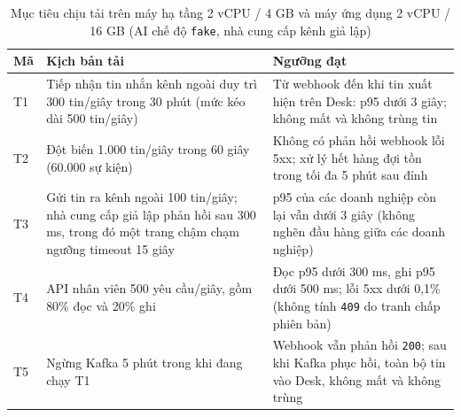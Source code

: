 \begin{table}[htbp]
  \centering
  \small
  \setlength{\tabcolsep}{4pt}
  \renewcommand{\arraystretch}{1.2}
  \caption{Mục tiêu chịu tải trên máy hạ tầng 2 vCPU / 4 GB và máy ứng dụng 2 vCPU / 16 GB (AI chế độ \texttt{fake}, nhà cung cấp kênh giả lập)}\label{tab:load-targets}
  \begin{tabularx}{\linewidth}{@{}
    >{\raggedright\arraybackslash}p{0.8cm}
    >{\raggedright\arraybackslash}X
    >{\raggedright\arraybackslash}X@{}}
    \toprule
    Mã & Kịch bản tải & Ngưỡng đạt \\
    \midrule
    T1 & Tiếp nhận tin nhắn kênh ngoài duy trì 300 tin/giây trong 30 phút (mức kéo dài 500 tin/giây) &
    Từ webhook đến khi tin xuất hiện trên Desk: p95 dưới 3 giây; không mất và không trùng tin \\
    T2 & Đột biến 1.000 tin/giây trong 60 giây (60.000 sự kiện) &
    Không có phản hồi webhook lỗi 5xx; xử lý hết hàng đợi tồn trong tối đa 5 phút sau đỉnh \\
    T3 & Gửi tin ra kênh ngoài 100 tin/giây; nhà cung cấp giả lập phản hồi sau 300 ms, trong đó một trang chậm chạm ngưỡng timeout 15 giây &
    p95 của các doanh nghiệp còn lại vẫn dưới 3 giây (không nghẽn đầu hàng giữa các doanh nghiệp) \\
    T4 & API nhân viên 500 yêu cầu/giây, gồm 80\% đọc và 20\% ghi &
    Đọc p95 dưới 300 ms, ghi p95 dưới 500 ms; lỗi 5xx dưới 0,1\% (không tính \texttt{409} do tranh chấp phiên bản) \\
    T5 & Ngừng Kafka 5 phút trong khi đang chạy T1 &
    Webhook vẫn phản hồi \texttt{200}; sau khi Kafka phục hồi, toàn bộ tin vào Desk, không mất và không trùng \\
    \bottomrule
  \end{tabularx}
\end{table}

